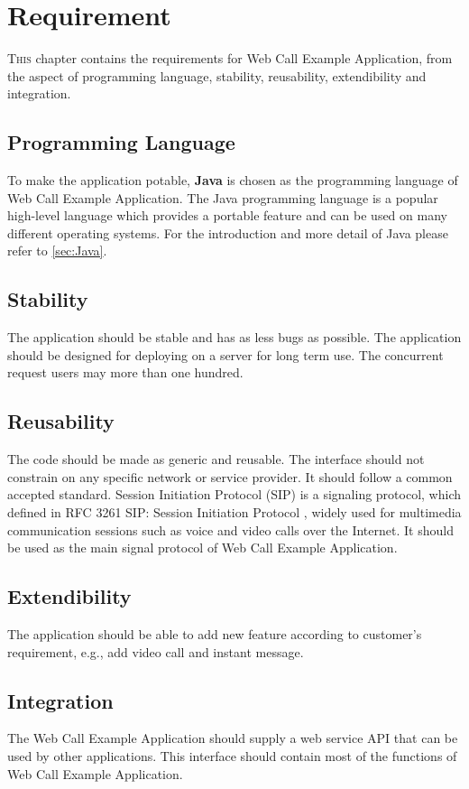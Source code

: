 \chapter{Requirement}
\label{sec:Requirement}

\lettrine[lines=3]{T}{his} chapter contains the requirements for \textsf{Web Call Example Application}, from the aspect of programming language, stability, reusability, extendibility and integration. 

\section{Programming Language}
\label{sec:Requirement:ProgrammingLanguage}

To make the application potable, \textbf{Java} is chosen as the programming language of Web Call Example Application. The Java programming language is a popular high-level language which provides a portable feature and can be used on many different operating systems. For the introduction and more detail of Java please refer to \ref{sec:Java}.

\section{Stability}
\label{sec:Requirement:Stability}

The application should be stable and has as less bugs as possible. The application should be designed for deploying on a server for long term use. The concurrent request users may more than one hundred. 

\section{Reusability}
\label{sec:Requirement:Reusability}

The code should be made as generic and reusable. The interface should not constrain on any specific network or service provider. It should follow a common accepted standard. Session Initiation Protocol (SIP) is a signaling protocol, which defined in RFC 3261 SIP: Session Initiation Protocol \cite{RFC3261}, widely used for multimedia communication sessions such as voice and video calls over the Internet. It should be used as the main signal protocol of Web Call Example Application.

\section{Extendibility}
\label{sec:Requirement:Extendibility}
The application should be able to add new feature according to customer's requirement, e.g., add video call and instant message.

\section{Integration}
\label{sec:Requirement:Integration}

The Web Call Example Application should supply a web service API that can be used by other applications. This interface should contain most of the functions of Web Call Example Application. 

